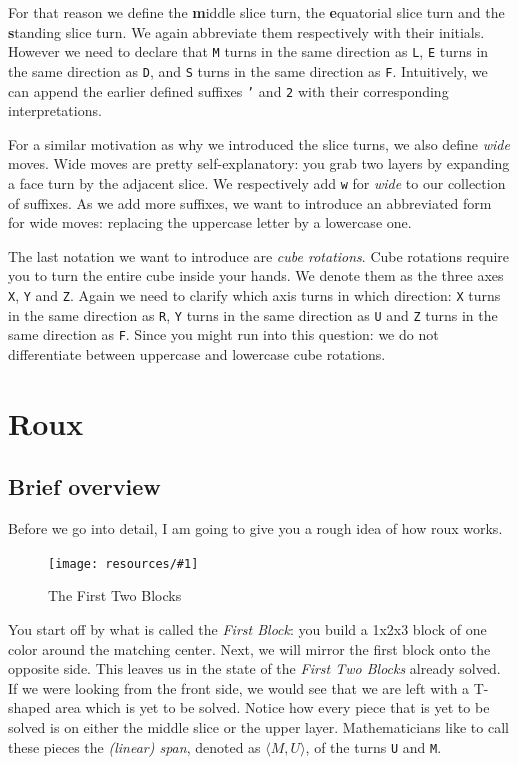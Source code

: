 \documentclass[a4paper]{scrreprt}
\newcommand{\wrapfig}[5] {
	\begin{figure}
	\centering
	\texttt{[image: resources/\#1]}
	\caption*{#5}
	\end{figure}
}
\begin{document}
For that reason we define the \textbf{m}iddle slice turn, the \textbf{e}quatorial slice turn and the \textbf{s}tanding slice turn. We again abbreviate them respectively with their initials. However we need to declare that \texttt{M} turns in the same direction as \texttt{L}, \texttt{E} turns in the same direction as \texttt{D}, and \texttt{S} turns in the same direction as \texttt{F}. Intuitively, we can append the earlier defined suffixes \texttt{'} and \texttt{2} with their corresponding interpretations.\par

For a similar motivation as why we introduced the slice turns, we also define \emph{wide} moves. Wide moves are pretty self-explanatory: you grab two layers by expanding a face turn by the adjacent slice. We respectively add \texttt{w} for \emph{wide} to our collection of suffixes. As we add more suffixes, we want to introduce an abbreviated form for wide moves: replacing the uppercase letter by a lowercase one.\par

The last notation we want to introduce are \emph{cube rotations}. Cube rotations require you to turn the entire cube inside your hands. We denote them as the three axes \texttt{X}, \texttt{Y} and \texttt{Z}. Again we need to clarify which axis turns in which direction: \texttt{X} turns in the same direction as \texttt{R}, \texttt{Y} turns in the same direction as \texttt{U} and \texttt{Z} turns in the same direction as \texttt{F}. Since you might run into this question: we do not differentiate between uppercase and lowercase cube rotations.


\chapter{Roux}

\section{Brief overview}

Before we go into detail, I am going to give you a rough idea of how roux works.\par

\wrapfig{f2b_transparent.png}{R}{0.3}{0.3}{The First Two Blocks}

You start off by what is called the \emph{First Block}: you build a 1x2x3 block of one color around the matching center. Next, we will mirror the first block onto the opposite side. This leaves us in the state of the \emph{First Two Blocks} already solved. If we were looking from the front side, we would see that we are left with a T-shaped area which is yet to be solved. Notice how every piece that is yet to be solved is on either the middle slice or the upper layer. Mathematicians like to call these pieces the \emph{(linear) span}, denoted as $\langle M, U \rangle$, of the turns \texttt{U} and \texttt{M}.\par
\end{document}
